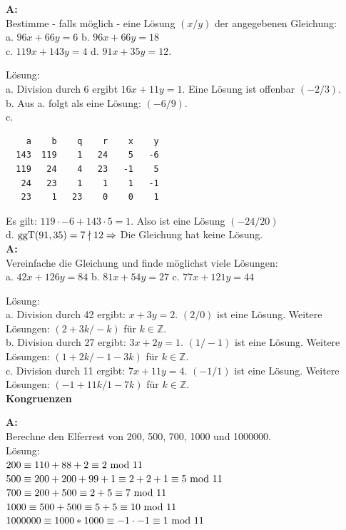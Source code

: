 \documentclass[landscape,twocolumn,a4paper]{article}
\begin{document}
\textbf{A:}   \\
Bestimme - falls möglich - eine Lösung $(x/y)$ der angegebenen Gleichung: \\
a.  $96x+66y=6$ \quad b. $96x+66y=18$ \\
c.  $119x+143y=4$ \quad d. $91x+35y=12$.
\bigskip {}
 
 Lösung: \\
 a. Division durch 6 ergibt $16x+11y=1$. Eine Lösung ist offenbar $(-2/3)$. \\
 b. Aus a. folgt als eine Lösung: $(-6/9)$. \\
 c. 
 \begin{lstlisting}
    a    b    q    r    x    y
  143  119    1   24    5   -6
  119   24    4   23   -1    5
   24   23    1    1    1   -1
   23    1   23    0    0    1
\end{lstlisting} Es gilt: $119 \cdot  -6 + 143 \cdot 5 = 1$. Also ist eine Lösung $(-24/20)$ \\
d. $\operatorname{ggT}(91,35) = 7 \nmid 12 \Rightarrow$ Die Gleichung hat keine Lösung. \\

 \textbf{A:}   \\
Vereinfache die Gleichung und finde möglichst viele Lösungen: \\
a.   $42x+126y=84$ \quad b. $81x+54y=27$ \quad 
 c. $77x+121y=44$ 
 \bigskip {}
 
 Lösung: \\
 a. Division durch 42 ergibt: $x + 3y = 2$. $(2/0)$ ist eine Lösung. Weitere Lösungen: $(2+3k/-k)$ für $k \in \mathbb{Z}$. \\
 b. Division durch 27 ergibt: $3x + 2y = 1$. $(1/-1)$ ist eine Lösung. Weitere Lösungen: $(1+2k/-1-3k)$ für $k \in \mathbb{Z}$. \\
 c. Division durch 11 ergibt: $7x + 11y = 4$. $(-1/1)$ ist eine Lösung. Weitere Lösungen: $(-1+11k/1-7k)$ für $k \in \mathbb{Z}$. \\



 
 \textbf{Kongruenzen} \bigskip
 
 \textbf{A:}   \\
Berechne den Elferrest von 200, 500, 700, 1000 und 1000000. \\

Lösung: \\
$200 \equiv 110 + 88 + 2 \equiv 2 \text{ mod } 11$ \\
$500 \equiv 200 + 200 + 99 + 1 \equiv 2 + 2+ 1 \equiv 5 \text{ mod } 11$ \\
$700 \equiv 200 + 500 \equiv 2 + 5 \equiv 7 \text{ mod } 11$ \\
$1000 \equiv 500 + 500 \equiv 5 + 5 \equiv 10 \text{ mod } 11$ \\
$1000000 \equiv 1000 * 1000 \equiv -1 \cdot -1 \equiv 1 \text{ mod } 11$ \\
\end{document}

